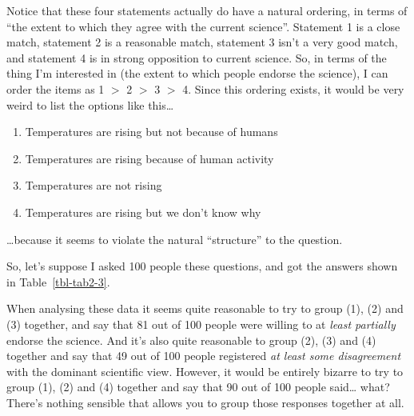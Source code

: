 \documentclass[
  a4paper,
]{book}
\providecommand{\tightlist}{%
  \setlength{\itemsep}{0pt}\setlength{\parskip}{0pt}}
\begin{document}
Notice that these four statements actually do have a natural ordering,
in terms of ``the extent to which they agree with the current science''.
Statement 1 is a close match, statement 2 is a reasonable match,
statement 3 isn't a very good match, and statement 4 is in strong
opposition to current science. So, in terms of the thing I'm interested
in (the extent to which people endorse the science), I can order the
items as 1 \(>\) 2 \(>\) 3 \(>\) 4. Since this ordering exists, it would
be very weird to list the options like this\ldots{}

\begin{enumerate}
\def\labelenumi{\arabic{enumi}.}
\tightlist
\item
  Temperatures are rising but not because of humans
\item
  Temperatures are rising because of human activity
\item
  Temperatures are not rising
\item
  Temperatures are rising but we don't know why
\end{enumerate}

\ldots because it seems to violate the natural ``structure'' to the
question.

So, let's suppose I asked 100 people these questions, and got the
answers shown in Table~\ref{tbl-tab2-3}.

\begin{table}

\caption{\label{tbl-tab2-3}Attitudes to climate change}

\centering
{}

\end{table}%

When analysing these data it seems quite reasonable to try to group (1),
(2) and (3) together, and say that 81 out of 100 people were willing to
at \emph{least partially} endorse the science. And it's also quite
reasonable to group (2), (3) and (4) together and say that 49 out of 100
people registered \emph{at least some disagreement} with the dominant
scientific view. However, it would be entirely bizarre to try to group
(1), (2) and (4) together and say that 90 out of 100 people said\ldots{}
what? There's nothing sensible that allows you to group those responses
together at all.
\end{document}
